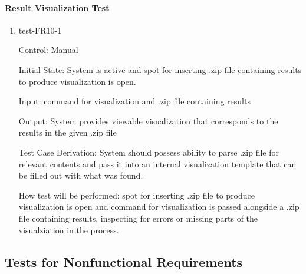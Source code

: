 \documentclass[12pt, titlepage]{article}
\begin{document}
\paragraph{Result Visualization Test}

\begin{enumerate}

\item{test-FR10-1\\}

Control: Manual
					
Initial State: System is active and spot for inserting .zip file containing
results to produce visualization is open.
					
Input: command for visualization and .zip file containing results
					
Output: System provides viewable visualization that corresponds to the results
in the given .zip file

Test Case Derivation: System should possess ability to parse .zip file for 
relevant contents and pass it into an internal visualization template that 
can be filled out with what was found.

How test will be performed: spot for inserting .zip file to produce 
visualization is open and command for visualization is passed alongside
a .zip file containing results, inspecting for errors or missing parts 
of the visualziation in the process.
\end{enumerate}

\subsection{Tests for Nonfunctional Requirements}



\end{document}
